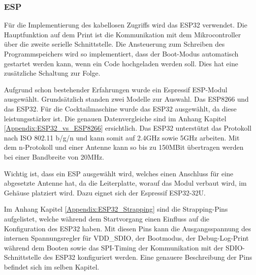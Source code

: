 \newpage
\subsubsection{ESP}
\label{subsubsec:ESP}

Für die Implementierung des kabellosen Zugriffs wird das ESP32 verwendet. Die Hauptfunktion auf dem Print ist die Kommunikation mit dem Mikrocontroller über die zweite serielle Schnittstelle. Die Ansteuerung zum Schreiben des Programmspeichers wird so implementiert, dass der Boot-Modus automatisch gestartet werden kann, wenn ein Code hochgeladen werden soll. Dies hat eine zusätzliche Schaltung zur Folge.

Aufgrund schon bestehender Erfahrungen wurde ein Espressif ESP-Modul ausgewählt. Grundsätzlich standen zwei Modelle zur Auswahl. Das ESP8266 und das ESP32. Für die Cocktailmaschine wurde das ESP32 ausgewählt, da diese leistungsstärker ist. Die genauen Datenvergleiche sind im Anhang Kapitel \ref{Appendix:ESP32_vs_ESP8266} ersichtlich. Das ESP32 unterstützt das Protokoll nach ISO 802.11 b/g/n und kann somit auf 2.4GHz sowie 5GHz arbeiten. Mit dem n-Protokoll und einer Antenne kann so bis zu 150MBit übertragen werden bei einer Bandbreite von 20MHz.

Wichtig ist, dass ein ESP ausgewählt wird, welches einen Anschluss für eine abgesetzte Antenne hat, da die Leiterplatte, worauf das Modul verbaut wird, im Gehäuse platziert wird. Dazu eignet sich der Espressif ESP32-32U.

Im Anhang Kapitel \ref{Appendix:ESP32_Strapping} sind die Strapping-Pins aufgelistet, welche während dem Startvorgang einen Einfluss auf die Konfiguration des ESP32 haben. Mit diesen Pins kann die Ausgangsspannung des internen Spannungsregler für VDD\_SDIO, der Bootmodus, der Debug-Log-Print während dem Booten sowie das SPI-Timing der Kommunikation mit der SDIO-Schnittstelle des ESP32 konfiguriert werden. Eine genauere Beschreibung der Pins befindet sich im selben Kapitel.

%

